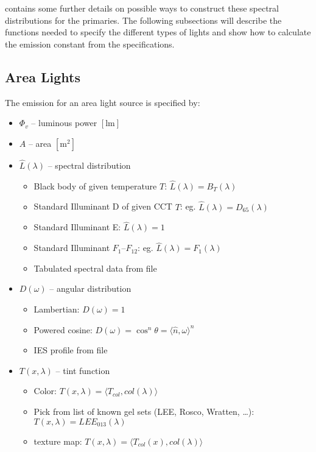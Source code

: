  contains some further details on possible ways
to construct these spectral distributions for the primaries. The following
subsections will describe the functions needed to specify the different types of
lights and show how to calculate the emission constant from the specifications.

\subsection{Area Lights}

The emission for an area light source is specified by:
\begin{itemize}
\item $\Phi_v$ -- luminous power $[\unit{\lumen}]$
\item $A$ -- area $[\unit{\square\meter}]$
\item $\hat{L}(\lambda)$ -- spectral distribution
  \begin{itemize}\small\it
  \item Black body of given temperature $T$: $\hat{L}(\lambda) = B_T(\lambda)$
  \item Standard Illuminant D of given CCT $T$: eg. $\hat{L}(\lambda) = D_{65}(\lambda)$
  \item Standard Illuminant E: $\hat{L}(\lambda) = 1$
  \item Standard Illuminant $F_1$--$F_{12}$: eg. $\hat{L}(\lambda) = F_1(\lambda)$
  \item Tabulated spectral data from file
  \end{itemize}
\item $D(\omega)$ -- angular distribution
  \begin{itemize}\small\it
  \item Lambertian: $D(\omega) = 1$
  \item Powered cosine: $D(\omega) = \cos^n \theta = \langle \hat n,\omega \rangle^n$
  \item IES profile from file
  \end{itemize}
\item $T(x,\lambda)$ -- tint function
  \begin{itemize}\small\it
  \item Color: $T(x,\lambda) = \langle T_{col}, col(\lambda)\rangle$
  \item Pick from list of known gel sets (LEE, Rosco, Wratten, \ldots): $T(x, \lambda) = LEE_{013} (\lambda)$
  \item texture map: $T(x,\lambda) = \langle T_{col}(x), col(\lambda)\rangle$
  \end{itemize}
\end{itemize}

